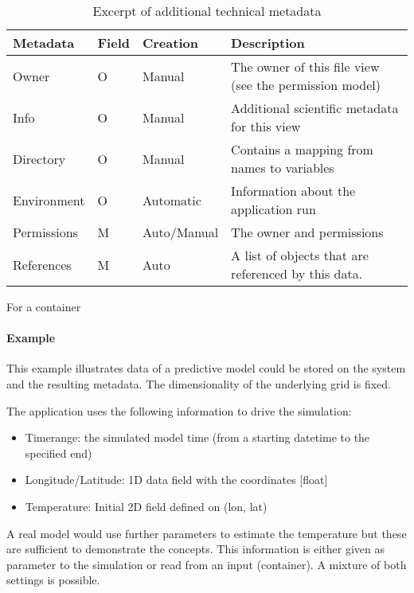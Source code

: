 \begin{table}

\begin{subtable}[t]{\textwidth}
\begin{tabular}{llll}
Metadata & Field & Creation & Description\\
\hline
Owner    & O     & Manual   & The owner of this file view (see the permission model)\\
Info     & O     & Manual   & Additional scientific metadata for this view\\
Directory & O    & Manual   & Contains a mapping from names to variables\\
Environment & O  & Automatic & Information about the application run\\
Permissions & M & Auto/Manual & The owner and permissions \\
References  & M & Auto & A list of objects that are referenced by this data.
\end{tabular}
\caption{For a container}
\end{subtable}
\caption{Excerpt of additional technical metadata}
\label{tbl:additionalTechnicalMetadata}
\end{table}


\paragraph{Example}

This example illustrates data of a predictive model could be stored on the system and the resulting metadata.
The dimensionality of the underlying grid is fixed.

The application uses the following information to drive the simulation:
\begin{itemize}
 \item Timerange: the simulated model time (from a starting datetime to the specified end)
 \item Longitude/Latitude: 1D data field with the coordinates [float]
 \item Temperature: Initial 2D field defined on (lon, lat)
\end{itemize}
A real model would use further parameters to estimate the temperature but these are sufficient to demonstrate the concepts.
This information is either given as parameter to the simulation or read from an input (container).
A mixture of both settings is possible.


